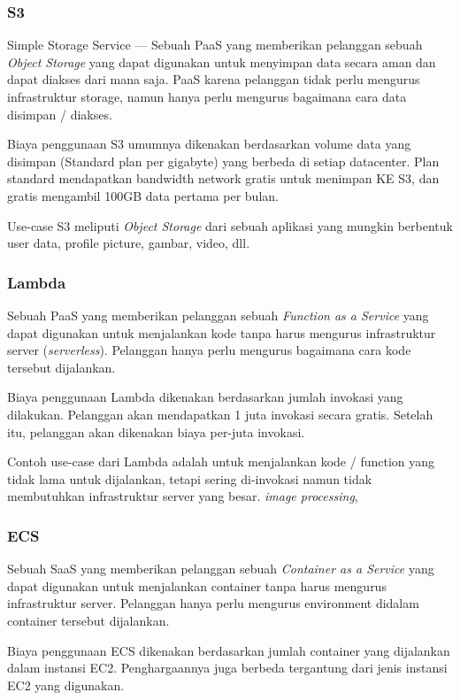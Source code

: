 \documentclass[
	11pt, %
	indonesian
]{assignment}
\begin{document}
\subsubsection*{S3}

Simple Storage Service --- Sebuah PaaS yang memberikan pelanggan sebuah \textit{Object Storage} yang dapat digunakan untuk menyimpan data secara aman dan dapat diakses dari mana saja. PaaS karena pelanggan tidak perlu mengurus infrastruktur storage, namun hanya perlu mengurus bagaimana cara data disimpan / diakses.

Biaya penggunaan S3 umumnya dikenakan berdasarkan volume data yang disimpan (Standard plan per gigabyte) yang berbeda di setiap datacenter. Plan standard mendapatkan bandwidth network gratis untuk menimpan KE S3, dan gratis mengambil 100GB data pertama per bulan.

Use-case S3 meliputi \textit{Object Storage} dari sebuah aplikasi yang mungkin berbentuk user data, profile picture, gambar, video, dll.

\subsubsection*{Lambda}

Sebuah PaaS yang memberikan pelanggan sebuah \textit{Function as a Service} yang dapat digunakan untuk menjalankan kode tanpa harus mengurus infrastruktur server (\textit{serverless}). Pelanggan hanya perlu mengurus bagaimana cara kode tersebut dijalankan.

Biaya penggunaan Lambda dikenakan berdasarkan jumlah invokasi yang dilakukan. Pelanggan akan mendapatkan 1 juta invokasi secara gratis. Setelah itu, pelanggan akan dikenakan biaya per-juta invokasi.

Contoh use-case dari Lambda adalah untuk menjalankan kode / function yang tidak lama untuk dijalankan, tetapi sering di-invokasi namun tidak membutuhkan infrastruktur server yang besar. \textit{image processing},

\subsubsection*{ECS}

Sebuah SaaS yang memberikan pelanggan sebuah \textit{Container as a Service} yang dapat digunakan untuk menjalankan container tanpa harus mengurus infrastruktur server. Pelanggan hanya perlu mengurus environment didalam container tersebut dijalankan.

Biaya penggunaan ECS dikenakan berdasarkan jumlah container yang dijalankan dalam instansi EC2. Penghargaannya juga berbeda tergantung dari jenis instansi EC2 yang digunakan.
\end{document}
